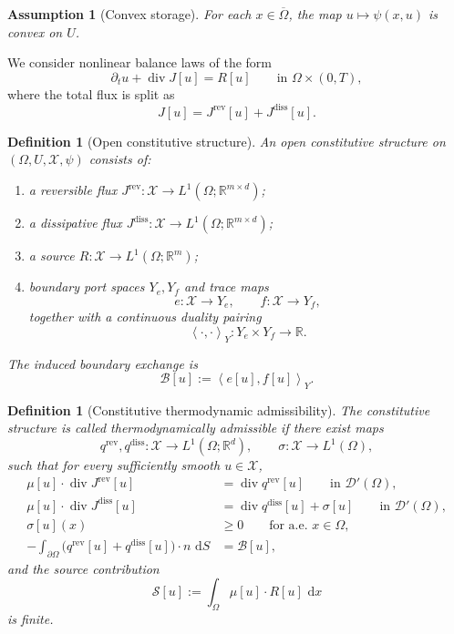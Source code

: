 \documentclass[11pt]{article}
\newtheorem{definition}[theorem]{Definition}
\newtheorem{assumption}[theorem]{Assumption}
\newcommand{\R}{\mathbb{R}}
\newcommand{\Om}{\Omega}
\newcommand{\pa}{\partial}
\newcommand{\cl}{\overline}
\newcommand{\diver}{\operatorname{div}}
\newcommand{\dd}{\,\mathrm{d}}
\newcommand{\X}{\mathcal{X}}
\newcommand{\Bnd}{\mathcal{B}}
\newcommand{\Src}{\mathcal{S}}
\newcommand{\pair}[2]{\left\langle #1,#2\right\rangle}
\begin{document}
\begin{assumption}[Convex storage]\label{ass:convex-storage}
For each \(x\in\cl{\Om}\), the map \(u\mapsto \psi(x,u)\) is convex on \(U\).
\end{assumption}

We consider nonlinear balance laws of the form
\begin{equation}\label{eq:master-pde}
\partial_t u + \diver J[u] = R[u]
\qquad \text{in }\Om\times(0,T),
\end{equation}
where the total flux is split as
\[
J[u]=J^{\mathrm{rev}}[u]+J^{\mathrm{diss}}[u].
\]

\begin{definition}[Open constitutive structure]
An \emph{open constitutive structure} on \((\Om,U,\X,\psi)\) consists of:
\begin{enumerate}[label=(\roman*),leftmargin=1.1cm]
    \item a reversible flux \(J^{\mathrm{rev}}:\X\to L^1(\Om;\R^{m\times d})\);
    \item a dissipative flux \(J^{\mathrm{diss}}:\X\to L^1(\Om;\R^{m\times d})\);
    \item a source \(R:\X\to L^1(\Om;\R^m)\);
    \item boundary port spaces \(Y_e,Y_f\) and trace maps
    \[
    e:\X\to Y_e,\qquad f:\X\to Y_f,
    \]
    together with a continuous duality pairing
    \[
    \pair{\cdot}{\cdot}_Y:Y_e\times Y_f\to\R.
    \]
\end{enumerate}
The induced boundary exchange is
\begin{equation}\label{eq:Bnd-def}
\Bnd[u]:=\pair{e[u]}{f[u]}_Y.
\end{equation}
\end{definition}

\begin{definition}[Constitutive thermodynamic admissibility]\label{def:constitutive-adm}
The constitutive structure is called \emph{thermodynamically admissible} if there
exist maps
\[
q^{\mathrm{rev}},q^{\mathrm{diss}}:\X\to L^1(\Om;\R^d),
\qquad
\sigma:\X\to L^1(\Om),
\]
such that for every sufficiently smooth \(u\in\X\),
\begin{align}
\mu[u]\cdot \diver J^{\mathrm{rev}}[u]
&=
\diver q^{\mathrm{rev}}[u]
\qquad \text{in }\mathscr{D}'(\Om),\label{eq:rev-id}\\
\mu[u]\cdot \diver J^{\mathrm{diss}}[u]
&=
\diver q^{\mathrm{diss}}[u]+\sigma[u]
\qquad \text{in }\mathscr{D}'(\Om),\label{eq:diss-id}\\
\sigma[u](x)&\ge 0
\qquad \text{for a.e. }x\in\Om,\label{eq:sigma-pos}\\
-\int_{\pa\Om}\bigl(q^{\mathrm{rev}}[u]+q^{\mathrm{diss}}[u]\bigr)\cdot n\,\dd S
&=
\Bnd[u],\label{eq:boundary-match}
\end{align}
and the source contribution
\begin{equation}\label{eq:source-contrib}
\Src[u]
:=
\int_\Om \mu[u]\cdot R[u]\,\dd x
\end{equation}
is finite.
\end{definition}
\end{document}
